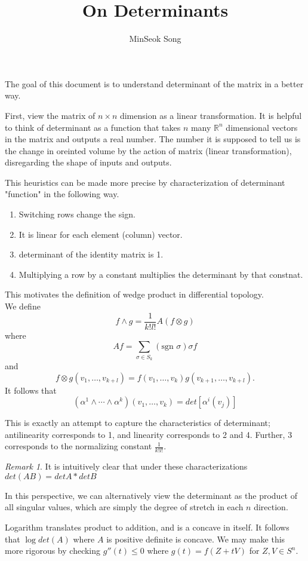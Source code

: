 \documentclass{article}
\title{On Determinants}
\author{MinSeok Song}
\date{}
\theoremstyle{remark}
\newtheorem{remark}[example]{Remark}
\begin{document}
\maketitle

The goal of this document is to understand determinant of the matrix in a better way.

First, view the matrix of $n\times n$ dimension as a linear transformation. It is helpful to think of determinant as a function that takes 
$n$ many $\mathbb{R}^n$ dimensional vectors in the matrix and outputs a real number. The number it is supposed to tell us is
 the change in oreinted volume by the action of matrix (linear transformation), disregarding the shape of inputs and outputs.

 This heuristics can be made more precise by characterization
  of determinant "function" in the following way.

  \begin{enumerate}
  \item Switching rows change the sign.
  \item It is linear for each element (column) vector.
  \item determinant of the identity matrix is 1.
  \item Multiplying a row by a constant multiplies the determinant by that constnat.
  \end{enumerate}

  This motivates the definition of wedge product in differential topology.\\

We define $$f\wedge g=\frac 1{k!l!}A(f\otimes g)$$ where
$$Af=\sum_{\sigma\in S_k}(\text{sgn } \sigma)\sigma f$$ and $$f\otimes g(v_1,\dots,v_{k+l})=f(v_1,\dots,v_k)g(v_{k+1},\dots,v_{k+l}).$$
  It follows that $$(\alpha^1\wedge\cdots\wedge \alpha^k)(v_1,\dots, v_k)=det[\alpha^i(v_j)]$$

This is exactly an attempt to capture the characteristics of determinant; antilinearity
 corresponds to 1, and linearity corresponds to 2 and 4. Further, 3 corresponds to the normalizing constant $\frac 1{k!l!}$.

 \begin{remark}
 \item It is intuitively clear that under these characterizations $det (AB)=det A*det B$
 \item In this perspective, we can alternatively view the determinant as the product of all singular values, which are simply the degree of stretch in each $n$ direction.
 \item Logarithm translates product to addition, and is a concave in itself. It follows that $\log det(A)$ where $A$ is positive definite
  is concave. We may make this more rigorous by checking $g''(t)\leq 0$ where $g(t)=f(Z+tV)$ for $Z,V\in S^n$.
 
 \end{remark}
\end{document}
